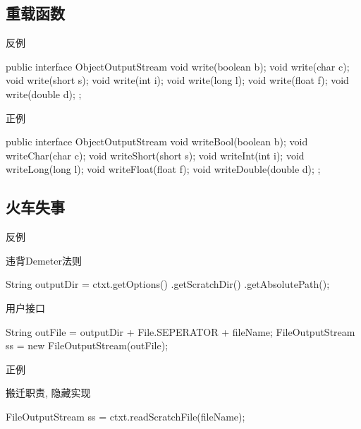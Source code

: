 \subsection{重载函数}

\begin{frame}[fragile]{反例}
\begin{java}
public interface ObjectOutputStream {
  void write(boolean b);
  void write(char c);
  void write(short s);
  void write(int i);
  void write(long l);
  void write(float f);
  void write(double d);
};
\end{java}
\end{frame}

\begin{frame}[fragile]{正例}
\begin{java}
public interface ObjectOutputStream {
  void writeBool(boolean b);
  void writeChar(char c);
  void writeShort(short s);
  void writeInt(int i);
  void writeLong(long l);
  void writeFloat(float f);
  void writeDouble(double d);
};
\end{java}
\end{frame}

\subsection{火车失事}

\begin{frame}[fragile]{反例}
\begin{block}{违背Demeter法则}
\begin{java}
String outputDir = ctxt.getOptions()
  .getScratchDir()
  .getAbsolutePath();
\end{java}
\end{block}

\begin{block}{用户接口}
\begin{java}
String outFile = outputDir + File.SEPERATOR + fileName;
FileOutputStream ss = new FileOutputStream(outFile);
\end{java}
\end{block}
\end{frame}

\begin{frame}[fragile]{正例}
\begin{block}{搬迁职责, 隐藏实现}
\begin{java}
FileOutputStream ss = ctxt.readScratchFile(fileName);
\end{java}
\end{block}
\end{frame}


